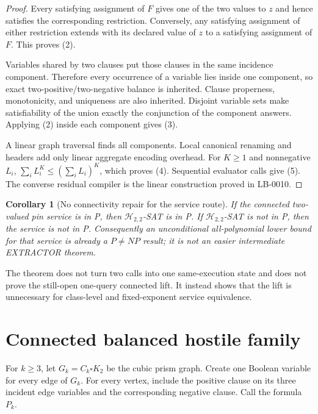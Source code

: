 \documentclass[11pt]{article}
\newtheorem{corollary}[theorem]{Corollary}
\newcommand{\Htwo}{\mathcal H_{2,2}}
\begin{document}
\begin{proof}
Every satisfying assignment of $F$ gives one of the two values to $z$ and
hence satisfies the corresponding restriction.  Conversely, any satisfying
assignment of either restriction extends with its declared value of $z$ to a
satisfying assignment of $F$.  This proves (2).

Variables shared by two clauses put those clauses in the same incidence
component.  Therefore every occurrence of a variable lies inside one
component, so exact two-positive/two-negative balance is inherited.  Clause
properness, monotonicity, and uniqueness are also inherited.  Disjoint
variable sets make satisfiability of the union exactly the conjunction of
the component answers.  Applying (2) inside each component gives (3).

A linear graph traversal finds all components.  Local canonical renaming and
headers add only linear aggregate encoding overhead.  For $K\ge1$ and
nonnegative $L_i$, $\sum_iL_i^K\le(\sum_iL_i)^K$, which proves (4).
Sequential evaluator calls give (5).  The converse residual compiler is the
linear construction proved in LB-0010.
\end{proof}

\begin{corollary}[No connectivity repair for the service route]
If the connected two-valued pin service is in P, then $\Htwo$-SAT is in P.
If $\Htwo$-SAT is not in P, then the service is not in P.  Consequently an
unconditional all-polynomial lower bound for that service is already a
$P\ne NP$ result; it is not an easier intermediate EXTRACTOR theorem.
\end{corollary}

The theorem does not turn two calls into one same-execution state and does
not prove the still-open one-query connected lift.  It instead shows that the
lift is unnecessary for class-level and fixed-exponent service equivalence.

\section{Connected balanced hostile family}

For $k\ge3$, let $G_k=C_k\square K_2$ be the cubic prism graph.  Create one
Boolean variable for every edge of $G_k$.  For every vertex, include the
positive clause on its three incident edge variables and the corresponding
negative clause.  Call the formula $P_k$.
\end{document}
